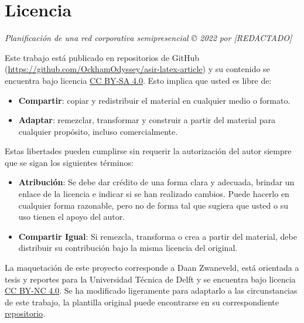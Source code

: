 \chapter*{Licencia}

\textit{Planificación de una red corporativa semipresencial © 2022 por [REDACTADO]}

Este trabajo está publicado en repositorios de GitHub (\underline{https://github.com/OckhamOdyssey/asir-latex-article}) y su contenido se encuentra bajo licencia \href{http://creativecommons.org/licenses/by-sa/4.0/}{CC BY-SA 4.0}. Esto implica que usted es libre de:
\begin{itemize}
\item \textbf{Compartir}: copiar y redistribuir el material en cualquier medio o formato.
\item \textbf{Adaptar}: remezclar, transformar y construir a partir del material para cualquier propósito, incluso comercialmente.
\end{itemize}
Estas libertades pueden cumplirse sin requerir la autorización del autor siempre que se sigan los siguientes términos:
\begin{itemize}
\item \textbf{Atribución}: Se debe dar crédito de una forma clara y adecuada, brindar un enlace de la licencia e indicar si se han realizado cambios. Puede hacerlo en cualquier forma razonable, pero no de forma tal que sugiera que usted o su uso tienen el apoyo del autor.
\item \textbf{Compartir Igual}: Si remezcla, transforma o crea a partir del material, debe distribuir su contribución bajo la misma licencia del original.
\end{itemize}

La maquetación de este proyecto corresponde a Daan Zwaneveld, está orientada a tesis y reportes para la Universidad Técnica de Delft y se encuentra bajo licencia \href{https://creativecommons.org/licenses/by-nc/4.0/}{\underline{CC BY-NC 4.0}}. Se ha modificado ligeramente para adaptarlo a las circunstancias de este trabajo, la plantilla original puede encontrarse en su correspondiente \href{https://github.com/dzwaneveld/TU-Delft-Unofficial-Report-Template}{\underline{repositorio}}.